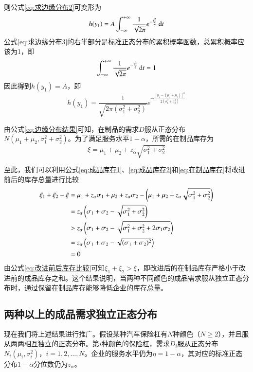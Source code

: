 则公式\ref{eq:求边缘分布2}可变形为
\begin{equation}
h(y_1) = A\int_{-\infty}^{+\infty}\frac{1}{\sqrt{2\pi}}e^{-\frac{t^2}{2}}\operatorname{d\!} t
\label{eq:求边缘分布3}
\end{equation}
公式\ref{eq:求边缘分布3}的右半部分是标准正态分布的累积概率函数，总累积概率应该为1，即
\[
\int_{-\infty}^{+\infty}\frac{1}{\sqrt{2\pi}}e^{-\frac{t^2}{2}}\operatorname{d\!} t = 1
\]
因此得到$h(y_1)=A$，即
\begin{equation}
h(y_1) = \frac{1}{\sqrt{2\pi(\sigma_1^2+\sigma_2^2)}}e^{-\frac{[y_1-(\mu_1+\mu_2)]^2}{2(\sigma_1^2+\sigma_2^2)}}
\label{eq:边缘分布结果}
\end{equation}

由公式\ref{eq:边缘分布结果}可知，在制品的需求$D$服从正态分布$N(\mu_1+\mu_2,\sigma_1^2+\sigma_2^2)$。为了满足服务水平$1-\alpha$，所需的在制品库存为
\begin{equation}
\xi = \mu_1 + \mu_2 + z_\alpha\sqrt{\sigma_1^2+\sigma_2^2}
\label{eq:在制品库存}
\end{equation}

至此，我们可以利用公式\ref{eq:成品库存1}、\ref{eq:成品库存2}和\ref{eq:在制品库存}将改进前后的库存总量进行比较
\begin{align}
\xi_1 + \xi_2 - \xi &= \mu_1 + z_\alpha\sigma_1 + \mu_2 + z_\alpha\sigma_2 - \left(\mu_1 + \mu_2 + z_\alpha\sqrt{\sigma_1^2+\sigma_2^2}\right) \notag\\
&= z_\alpha\left(\sigma_1+\sigma_2-\sqrt{\sigma_1^2+\sigma_2^2}\right) \notag\\
&> z_\alpha\left(\sigma_1+\sigma_2-\sqrt{\sigma_1^2+\sigma_2^2+2\sigma_1\sigma_2}\right) \notag\\
&= z_\alpha\left(\sigma_1+\sigma_2-\sqrt{(\sigma_1+\sigma_2)^2}\right) \notag\\
&= 0
\label{eq:改进前后库存比较}
\end{align}
由公式\ref{eq:改进前后库存比较}可知$\xi_1+\xi_2>\xi$，即改进后的在制品库存严格小于改进前的成品库存之和。这个结果说明，当两种不同颜色的成品需求服从独立正态分布时，通过保留在制品库存能够降低企业的库存总量。



\subsection{两种以上的成品需求独立正态分布}

现在我们将上述结果进行推广。假设某种汽车保险杠有$N$种颜色（$N\geq 2$），并且服从两两相互独立的正态分布。第$i$种颜色的保险杠，需求$D_i$服从正态分布$N_i(\mu_i,\sigma_i^2)$，$i=1,2,\ldots,N$。企业的服务水平仍为$\eta=1-\alpha$，其对应的标准正态分布$1-\alpha$分位数仍为$z_\alpha$。

